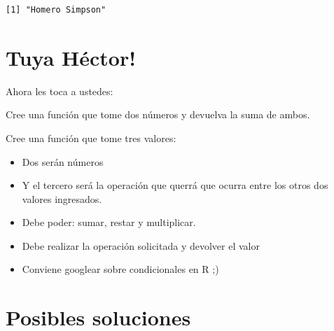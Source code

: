 \documentclass[
  letterpaper,
  DIV=11,
  numbers=noendperiod]{scrreprt}
\begin{document}
\begin{verbatim}
[1] "Homero Simpson"
\end{verbatim}

\hypertarget{tuya-huxe9ctor}{%
\section{Tuya Héctor!}\label{tuya-huxe9ctor}}

Ahora les toca a ustedes:

Cree una función que tome dos números y devuelva la suma de ambos.

Cree una función que tome tres valores:

\begin{itemize}
\item
  Dos serán números
\item
  Y el tercero será la operación que querrá que ocurra entre los otros
  dos valores ingresados.
\item
  Debe poder: sumar, restar y multiplicar.
\item
  Debe realizar la operación solicitada y devolver el valor
\item
  Conviene googlear sobre condicionales en R ;)
\end{itemize}

\hypertarget{posibles-soluciones}{%
\section{Posibles soluciones}\label{posibles-soluciones}}
\end{document}
